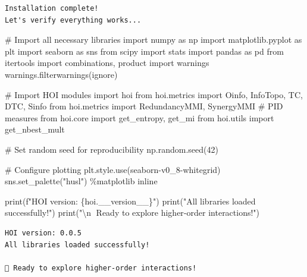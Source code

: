 \documentclass[
  11pt,
  letterpaper,
  oneside,
  openany]{book}
\newenvironment{Shaded}{\begin{snugshade}}{\end{snugshade}}
\newcommand{\BuiltInTok}[1]{\textcolor[rgb]{0.00,0.23,0.31}{#1}}
\newcommand{\CharTok}[1]{\textcolor[rgb]{0.13,0.47,0.30}{#1}}
\newcommand{\CommentTok}[1]{\textcolor[rgb]{0.37,0.37,0.37}{#1}}
\newcommand{\DecValTok}[1]{\textcolor[rgb]{0.68,0.00,0.00}{#1}}
\newcommand{\ImportTok}[1]{\textcolor[rgb]{0.00,0.46,0.62}{#1}}
\newcommand{\NormalTok}[1]{\textcolor[rgb]{0.00,0.23,0.31}{#1}}
\newcommand{\OperatorTok}[1]{\textcolor[rgb]{0.37,0.37,0.37}{#1}}
\newcommand{\SpecialCharTok}[1]{\textcolor[rgb]{0.37,0.37,0.37}{#1}}
\newcommand{\SpecialStringTok}[1]{\textcolor[rgb]{0.13,0.47,0.30}{#1}}
\newcommand{\StringTok}[1]{\textcolor[rgb]{0.13,0.47,0.30}{#1}}
\begin{document}
\begin{verbatim}
Installation complete!
Let's verify everything works...
\end{verbatim}

\begin{Shaded}
\begin{Highlighting}[]
\CommentTok{\# Import all necessary libraries}
\ImportTok{import}\NormalTok{ numpy }\ImportTok{as}\NormalTok{ np}
\ImportTok{import}\NormalTok{ matplotlib.pyplot }\ImportTok{as}\NormalTok{ plt}
\ImportTok{import}\NormalTok{ seaborn }\ImportTok{as}\NormalTok{ sns}
\ImportTok{from}\NormalTok{ scipy }\ImportTok{import}\NormalTok{ stats}
\ImportTok{import}\NormalTok{ pandas }\ImportTok{as}\NormalTok{ pd}
\ImportTok{from}\NormalTok{ itertools }\ImportTok{import}\NormalTok{ combinations, product}
\ImportTok{import}\NormalTok{ warnings}
\NormalTok{warnings.filterwarnings(}\StringTok{\textquotesingle{}ignore\textquotesingle{}}\NormalTok{)}

\CommentTok{\# Import HOI modules}
\ImportTok{import}\NormalTok{ hoi}
\ImportTok{from}\NormalTok{ hoi.metrics }\ImportTok{import}\NormalTok{ Oinfo, InfoTopo, TC, DTC, Sinfo}
\ImportTok{from}\NormalTok{ hoi.metrics }\ImportTok{import}\NormalTok{ RedundancyMMI, SynergyMMI  }\CommentTok{\# PID measures}
\ImportTok{from}\NormalTok{ hoi.core }\ImportTok{import}\NormalTok{ get\_entropy, get\_mi}
\ImportTok{from}\NormalTok{ hoi.utils }\ImportTok{import}\NormalTok{ get\_nbest\_mult}

\CommentTok{\# Set random seed for reproducibility}
\NormalTok{np.random.seed(}\DecValTok{42}\NormalTok{)}

\CommentTok{\# Configure plotting}
\NormalTok{plt.style.use(}\StringTok{\textquotesingle{}seaborn{-}v0\_8{-}whitegrid\textquotesingle{}}\NormalTok{)}
\NormalTok{sns.set\_palette(}\StringTok{"husl"}\NormalTok{)}
\OperatorTok{\%}\NormalTok{matplotlib inline}

\BuiltInTok{print}\NormalTok{(}\SpecialStringTok{f"HOI version: }\SpecialCharTok{\{}\NormalTok{hoi}\SpecialCharTok{.}\NormalTok{\_\_version\_\_}\SpecialCharTok{\}}\SpecialStringTok{"}\NormalTok{)}
\BuiltInTok{print}\NormalTok{(}\StringTok{"All libraries loaded successfully!"}\NormalTok{)}
\BuiltInTok{print}\NormalTok{(}\StringTok{"}\CharTok{\textbackslash{}n}\StringTok{🎉 Ready to explore higher{-}order interactions!"}\NormalTok{)}
\end{Highlighting}
\end{Shaded}

\begin{verbatim}
HOI version: 0.0.5
All libraries loaded successfully!

🎉 Ready to explore higher-order interactions!
\end{verbatim}
\end{document}
